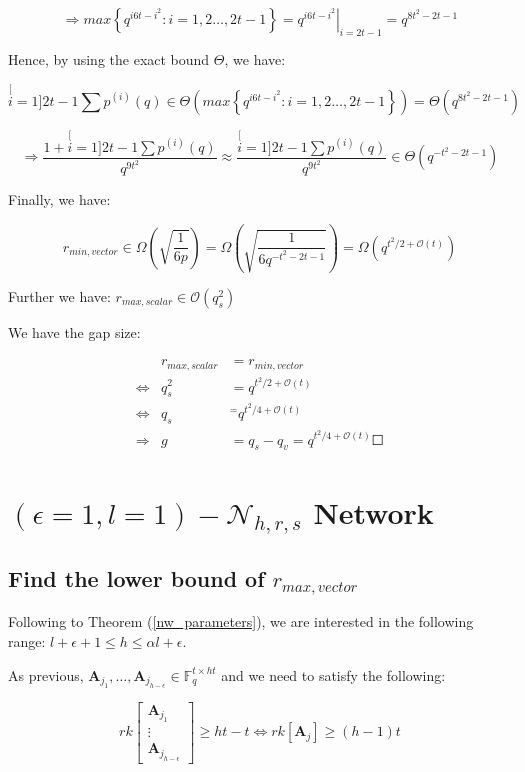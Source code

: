 \[
\Rightarrow max\left\{ q^{i6t-i^{2}}:i=1,2\ldots,2t-1\right\} =\left.q^{i6t-i^{2}}\right|_{i=2t-1}=q^{8t^{2}-2t-1}
\]

Hence, by using the exact bound $\Theta$, we have:

\[
\stackrel[i=1]{2t-1}{\mathop{\sum}}p^{(i)}(q)\in\Theta\left(max\left\{ q^{i6t-i^{2}}:i=1,2\ldots,2t-1\right\} \right)=\Theta\left(q^{8t^{2}-2t-1}\right)
\]

\[
\Rightarrow\frac{1+\stackrel[i=1]{2t-1}{\mathop{\sum}}p^{(i)}(q)}{q^{9t^{2}}}\approx\frac{\stackrel[i=1]{2t-1}{\mathop{\sum}}p^{(i)}(q)}{q^{9t^{2}}}\in\Theta\left(q^{-t^{2}-2t-1}\right)
\]

Finally, we have:

\[
r_{min,vector}\in\Omega\left(\sqrt{\frac{1}{6p}}\right)=\Omega\left(\sqrt{\frac{1}{6q^{-t^{2}-2t-1}}}\right)=\Omega\left(q^{t^{2}/2+\mathcal{O}\left(t\right)}\right)
\]

Further we have: $r_{max,scalar}\in\mathcal{O}\left(q_{s}^{2}\right)$
\cite{Wachter-Zeh:2018}

We have the gap size:

\begin{eqnarray*}
 & r_{max,scalar} & =r_{min,vector}\\
\Leftrightarrow & q_{s}^{2} & =q^{t^{2}/2+\mathcal{O}(t)}\\
\Leftrightarrow & q_{s} & ^{=}q^{t^{2}/4+\mathcal{O}(t)}\\
\Rightarrow & g & =q_{s}-q_{v}=q^{t^{2}/4+\mathcal{O}(t)}\Square
\end{eqnarray*}


\section{$\left(\epsilon=1,l=1\right)-\mathcal{N}_{h,r,s}$ Network}

\subsection{Find the lower bound of $r_{max,vector}$}

Following to Theorem (\ref{nw_parameters}), we are interested in
the following range: $l+\epsilon+1\leq h\leq\alpha l+\epsilon$.

As previous, $\boldsymbol{A}_{j_{1}},\ldots,\boldsymbol{A}_{j_{h-\epsilon}}\in\ensuremath{\mathbb{F}}_{q}^{t\times ht}$
and we need to satisfy the following:

\[
rk\left[\begin{array}{c}
\boldsymbol{A}_{j_{1}}\\
\vdots\\
\boldsymbol{A}_{j_{h-\epsilon}}
\end{array}\right]\geq ht-t\Leftrightarrow rk\left[\boldsymbol{A}_{j}\right]\geq(h-1)t
\]

